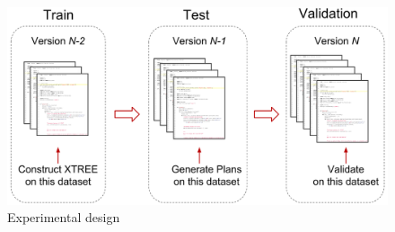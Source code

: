 \begin{figure}
\centering
\includegraphics[width=\linewidth]{expt_design.png}
 \caption{Experimental design}\label{fig:design}
\end{figure}